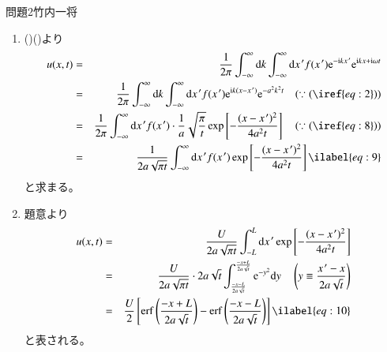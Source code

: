 \documentclass[fleqn]{jbook}
\newcommand{\pr}[1]{#1^{\,\prime}}  %
\newcommand{\erf}{\mathop{\rm erf}\nolimits} %
\begin{document}
\begin{answer}{問題2}{竹内一将}
\begin{enumerate}
\item

()()より
\begin{eqnarray}
 u(x,t)
 &=& \frac{1}{2\pi} \int_{-\infty}^\infty \mathrm{d} k \int_{-\infty}^\infty \mathrm{d} \pr{x}
    f(\pr{x}) \mathrm{e}^{-\mathrm{i} k\pr{x}} \mathrm{e}^{\mathrm{i} kx +\mathrm{i}\omega t}  \notag \\
 &=& \frac{1}{2\pi} \int_{-\infty}^\infty \mathrm{d} k \int_{-\infty}^\infty \mathrm{d} \pr{x}
    f(\pr{x}) \mathrm{e}^{\mathrm{i} k (x-\pr{x})} \mathrm{e}^{-a^2 k^2 t}  ~~~~(\because(\iref{eq:2}))
    \notag \\
 &=& \frac{1}{2\pi} \int_{-\infty}^\infty \mathrm{d} \pr{x} f(\pr{x}) \cdot
    \frac{1}{a} \sqrt{\frac{\pi}{t}}
    \exp \left[ -\frac{(x-\pr{x})^2}{4a^2 t} \right] ~~~~(\because(\iref{eq:8}))
    \notag \\
 &=& \frac{1}{2a\sqrt{\pi t}} \int_{-\infty}^\infty \mathrm{d} \pr{x} f(\pr{x})
    \exp \left[ -\frac{(x-\pr{x})^2}{4a^2 t} \right]  \ilabel{eq:9}
\end{eqnarray}
と求まる。

\item

題意より
\begin{eqnarray}
 u(x,t)
 &=& \frac{U}{2a\sqrt{\pi t}} \int_{-L}^L \mathrm{d} \pr{x}
    \exp \left[ -\frac{(x-\pr{x})^2}{4a^2 t} \right]  \notag \\
 &=& \frac{U}{2a\sqrt{\pi t}} \cdot 2a\sqrt{t}
    \int_\frac{-x-L}{2a\sqrt{t}}^\frac{-x+L}{2a\sqrt{t}} \mathrm{e}^{-y^2} \mathrm{d} y
    ~~~~\left( y \equiv \frac{\pr{x}-x}{2a\sqrt{t}} \right) \notag \\
 &=& \frac{U}{2} \left[ \erf \left( \frac{-x+L}{2a\sqrt{t}} \right) 
    -\erf \left( \frac{-x-L}{2a\sqrt{t}} \right) \right]  \ilabel{eq:10}
\end{eqnarray}
と表される。
\end{enumerate}
\end{answer}
\end{document}
